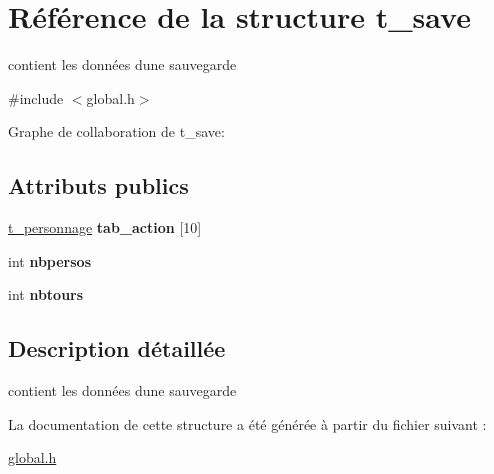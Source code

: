 \hypertarget{a00010}{}\section{Référence de la structure t\+\_\+save}
\label{a00010}


contient les données d\textquotesingle{}une sauvegarde  




{\ttfamily \#include $<$global.\+h$>$}



Graphe de collaboration de t\+\_\+save\+:
\subsection*{Attributs publics}
\begin{DoxyCompactItemize}
\item 
\hyperlink{a00009}{t\+\_\+personnage} {\bfseries tab\+\_\+action} \mbox{[}10\mbox{]}\hypertarget{a00010_a680cbb0935fc627ad4ad6b04d817d8ed}{}\label{a00010_a680cbb0935fc627ad4ad6b04d817d8ed}

\item 
int {\bfseries nbpersos}\hypertarget{a00010_a09cb4efc30f247f058ac7f06cfd68ea6}{}\label{a00010_a09cb4efc30f247f058ac7f06cfd68ea6}

\item 
int {\bfseries nbtours}\hypertarget{a00010_aa7248684bb8d898267db7a53c686300e}{}\label{a00010_aa7248684bb8d898267db7a53c686300e}

\end{DoxyCompactItemize}


\subsection{Description détaillée}
contient les données d\textquotesingle{}une sauvegarde 

La documentation de cette structure a été générée à partir du fichier suivant \+:\begin{DoxyCompactItemize}
\item 
\hyperlink{a00021}{global.\+h}\end{DoxyCompactItemize}
